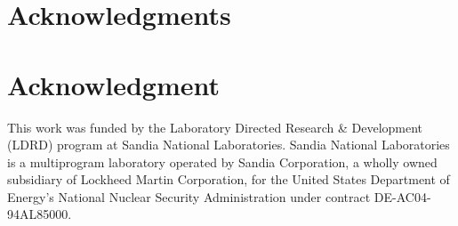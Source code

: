 \documentclass[conference]{IEEEtran}
\begin{document}
\ifCLASSOPTIONcompsoc
\section*{Acknowledgments}
\else
\section*{Acknowledgment}
\fi
This work was funded by the Laboratory Directed Research \&
Development (LDRD) program at Sandia National Laboratories. Sandia
National Laboratories is a multiprogram laboratory operated by Sandia
Corporation, a wholly owned subsidiary of Lockheed Martin Corporation,
for the United States Department of Energy's National Nuclear Security
Administration under contract DE-AC04-94AL85000.

\ifCLASSOPTIONcaptionsoff
  \newpage
\fi
\end{document}
